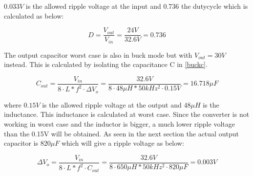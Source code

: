 $0.033V$ is the allowed ripple voltage at the input and 0.736 the dutycycle which is calculated as below:

\begin{equation} \label{buckduty}
D = \frac{V_{out}}{V_{in}} = \frac{24V}{32.6V} = 0.736
\end{equation} 


The output capacitor worst case is also in buck mode but with $V_{out}=30V$  instead. This is calculated by isolating the capacitance C in \ref{buckc}. 

\begin{equation} \label{buckc} 
C_{out} =\frac{V_{in}}{8\cdot L*f^2\cdot \Delta V_o} = \frac{32.6V}{8\cdot 48\mu H*50kHz^2\cdot 0.15V} = 16.718\mu F
\end{equation}

where $0.15V$ is the allowed ripple voltage at the output and $48\mu H$ is the inductance. This inductance is calculated at worst case. 
Since the converter is not working in worst case and the inductor is bigger, a much lower ripple voltage than the 0.15V will be obtained. As seen in the next section the actual output capacitor is $820\mu F$ which will give a ripple voltage as below:

\begin{equation} \label{buckc} 
\Delta V_o = \frac{V_{in}}{8\cdot L*f^2\cdot C_{out}} = \frac{32.6V}{8\cdot 650\mu H*50kHz^2\cdot 820\mu F} = 0.003V
\end{equation}
   